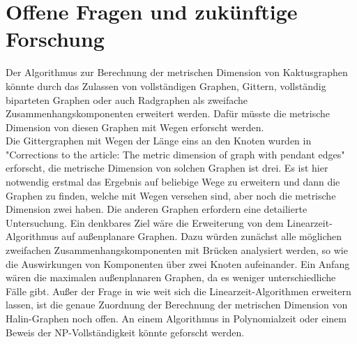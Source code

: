 \section{Offene Fragen und zukünftige Forschung}
\vspace{-2mm}
Der Algorithmus zur Berechnung der metrischen Dimension von Kaktusgraphen könnte durch das Zulassen von vollständigen Graphen, Gittern, vollständig biparteten Graphen oder auch Radgraphen als zweifache Zusammenhangskomponenten erweitert werden. Dafür müsste die metrische Dimension von diesen Graphen mit Wegen erforscht werden.\\ Die Gittergraphen mit Wegen der Länge eins an den Knoten wurden in "Corrections to the article: The metric dimension of graph with pendant edges"\cite{grid} erforscht, die metrische Dimension von solchen Graphen ist drei. Es ist hier notwendig erstmal das Ergebnis auf beliebige Wege zu erweitern und dann die Graphen zu finden, welche mit Wegen versehen sind, aber noch die metrische Dimension zwei haben. Die anderen Graphen erfordern eine detailierte Untersuchung.
\vspace{-1.5mm}\newline\newline
Ein denkbares Ziel wäre die Erweiterung von dem Linearzeit-Algorithmus auf außenplanare Graphen. Dazu würden zunächst alle möglichen zweifachen Zusammenhangskomponenten mit Brücken analysiert werden, so wie die Auswirkungen von Komponenten über zwei Knoten aufeinander. Ein Anfang wären die maximalen außenplanaren Graphen, da es weniger unterschiedliche Fälle gibt.
\vspace{-1.5mm}\newline\newline
Außer der Frage in wie weit sich die Linearzeit-Algorithmen erweitern lassen, ist die genaue Zuordnung der Berechnung der metrischen Dimension von Halin-Graphen noch offen. An einem Algorithmus in Polynomialzeit oder einem Beweis der NP-Vollständigkeit könnte geforscht werden.


\clearpage


\thispagestyle{empty}
\clearpage
\thispagestyle{empty}
\listoffigures
\thispagestyle{empty}
\listoftables
\thispagestyle{empty}

